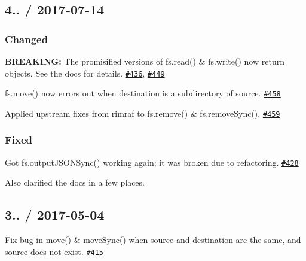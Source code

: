 \subsection*{4.. / 2017-\/07-\/14 }

\subsubsection*{Changed}


\begin{DoxyItemize}
\item {\bfseries B\+R\+E\+A\+K\+I\+NG\+:} The promisified versions of {\ttfamily fs.\+read()} \& {\ttfamily fs.\+write()} now return objects. See the docs for details. \href{https://github.com/jprichardson/node-fs-extra/issues/436}{\tt \#436}, \href{https://github.com/jprichardson/node-fs-extra/pull/449}{\tt \#449}
\item {\ttfamily fs.\+move()} now errors out when destination is a subdirectory of source. \href{https://github.com/jprichardson/node-fs-extra/pull/458}{\tt \#458}
\item Applied upstream fixes from {\ttfamily rimraf} to {\ttfamily fs.\+remove()} \& {\ttfamily fs.\+remove\+Sync()}. \href{https://github.com/jprichardson/node-fs-extra/pull/459}{\tt \#459}
\end{DoxyItemize}

\subsubsection*{Fixed}


\begin{DoxyItemize}
\item Got {\ttfamily fs.\+output\+J\+S\+O\+N\+Sync()} working again; it was broken due to refactoring. \href{https://github.com/jprichardson/node-fs-extra/pull/428}{\tt \#428}
\end{DoxyItemize}

Also clarified the docs in a few places.

\subsection*{3.. / 2017-\/05-\/04 }


\begin{DoxyItemize}
\item Fix bug in {\ttfamily move()} \& {\ttfamily move\+Sync()} when source and destination are the same, and source does not exist. \href{https://github.com/jprichardson/node-fs-extra/pull/415}{\tt \#415}
\end{DoxyItemize}

